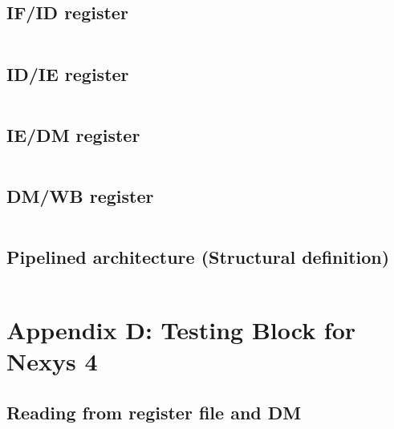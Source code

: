 \subsection{IF/ID register}
\begin{code}
\label{code:IF_ID}  
\inputminted[fontsize=\footnotesize]{vhdl}{\srcfolder IF_ID.vhd}
\end{code}

\subsection{ID/IE register}
\begin{code}
\label{code:ID_IE}  
\inputminted[fontsize=\footnotesize]{vhdl}{\srcfolder ID_IE.vhd}
\end{code}

\subsection{IE/DM register}
\begin{code}
\label{code:IE_DM}  
\inputminted[fontsize=\footnotesize]{vhdl}{\srcfolder IE_DM.vhd}
\end{code}

\subsection{DM/WB register}
\begin{code}
\label{code:DM_WB}  
\inputminted[fontsize=\footnotesize]{vhdl}{\srcfolder DM_WB.vhd}
\end{code}

\subsection{Pipelined architecture (Structural definition)}
\begin{code}
\label{code:DTPTH_pipelined}  
\inputminted[fontsize=\footnotesize]{vhdl}{\srcfolder datapath.vhd}
\end{code}


\section{Appendix D: Testing Block for Nexys 4}

\subsection{Reading from register file and DM}
\begin{code}
\label{code:mem_read}  
\inputminted[fontsize=\footnotesize]{vhdl}{\srcfolder memory_reader.vhd}
\end{code}
